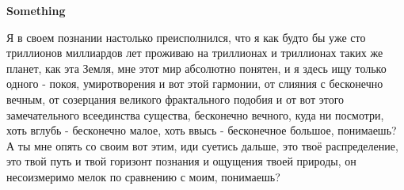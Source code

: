 \begin{titlepage}
\begin{center}
    \vspace*{6cm} 
    
    {\Huge\bfseries Something\par}
    
    \vspace{4cm} %
    
    \begin{minipage}{0.8\textwidth}
        \large
        Я в своем познании настолько преисполнился, что я как будто бы уже
сто триллионов миллиардов лет проживаю на триллионах и
триллионах таких же планет, как эта Земля, мне этот мир абсолютно
понятен, и я здесь ищу только одного - покоя, умиротворения и
вот этой гармонии, от слияния с бесконечно вечным, от созерцания
великого фрактального подобия и от вот этого замечательного всеединства
существа, бесконечно вечного, куда ни посмотри, хоть вглубь - бесконечно
малое, хоть ввысь - бесконечное большое, понимаешь? А ты мне опять со
своим вот этим, иди суетись дальше, это твоё распределение, это
твой путь и твой горизонт познания и ощущения твоей природы, он
несоизмеримо мелок по сравнению с моим, понимаешь?
    \end{minipage}

\end{center}

\vfill %

\end{titlepage}